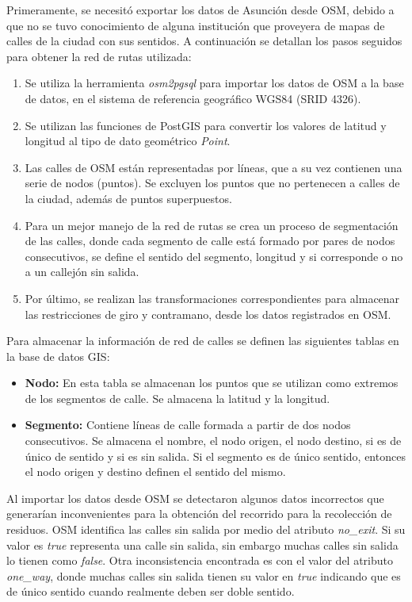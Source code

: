 Primeramente, se necesitó exportar los datos de Asunción desde OSM, debido a que no se tuvo conocimiento de alguna institución que proveyera de mapas de calles de la ciudad con sus sentidos. A continuación se detallan los pasos seguidos para obtener la red de rutas utilizada: 
\begin{enumerate}
    \item Se utiliza la herramienta \textit{osm2pgsql} para importar los datos de OSM a la base de datos, en el sistema de referencia geográfico WGS84 (SRID 4326). 
    \item Se utilizan las funciones de PostGIS para convertir los valores de latitud y longitud al tipo de dato geométrico \textit{Point}. 
    \item Las calles de OSM están representadas por líneas, que a su vez contienen una serie de nodos (puntos). Se excluyen los puntos que no pertenecen a calles de la ciudad, además de puntos superpuestos.
    \item Para un mejor manejo de la red de rutas se crea un proceso de segmentación de las calles, donde cada segmento de calle está formado por pares de nodos consecutivos, se define el sentido del segmento, longitud y si corresponde o no a un callejón sin salida.
    \item Por último, se realizan las transformaciones correspondientes para almacenar las restricciones de giro y contramano, desde los datos registrados en OSM.
\end{enumerate}

Para almacenar la información de red de calles se definen las siguientes tablas en la base de datos GIS:

\begin{itemize}
    \item \textbf{Nodo:} En esta tabla se almacenan los puntos que se utilizan como extremos de los segmentos de calle. Se almacena la latitud y la longitud.
    \item \textbf{Segmento:} Contiene líneas de calle formada a partir de dos nodos consecutivos. Se almacena el nombre, el nodo origen, el nodo destino, si es de único de sentido y si es sin salida. Si el segmento es de único sentido, entonces el nodo origen y destino definen el sentido del mismo.
\end{itemize}

Al importar los datos desde OSM se detectaron algunos datos incorrectos que generarían inconvenientes para la obtención del recorrido para la recolección de residuos. OSM identifica las calles sin salida por medio del atributo \textit{no\_exit}. Si su valor es \textit{true} representa una calle sin salida, sin embargo muchas calles sin salida lo tienen como \textit{false}. Otra inconsistencia encontrada es con el valor del atributo \textit{one\_way}, donde muchas calles sin salida tienen su valor en \textit{true} indicando que es de único sentido cuando realmente deben ser doble sentido.

